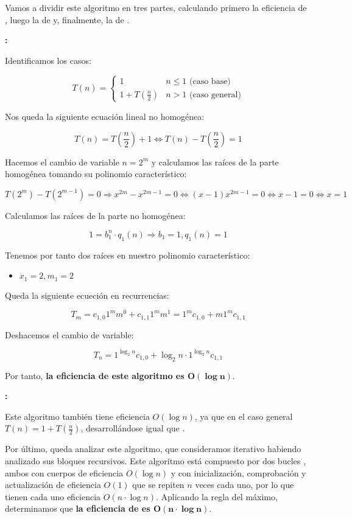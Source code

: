 Vamos a dividir este algoritmo en tres partes, calculando primero la eficiencia de , luego la de  y, finalmente, la de .

\textbf{:}

Identificamos los casos:

\[T(n)=
\begin{cases}
	1                & n\leq1\text{ (caso base)} \\
	1+T(\frac{n}{2}) & n>1\text{ (caso general)}
\end{cases}
\]

Nos queda la siguiente ecuación lineal no homogénea:

\[T(n)=T(\frac{n}{2})+1\Leftrightarrow T(n)-T(\frac{n}{2})=1\]

Hacemos el cambio de variable $n=2^m$ y calculamos las raíces de la parte homogénea tomando su polinomio característico:

\[T(2^m)-T(2^{m-1})=0\Rightarrow x^{2m}-x^{2m-1}=0\Leftrightarrow(x-1)x^{2m-1}=0\Leftrightarrow x-1=0\Leftrightarrow x=1\]

Calculamos las raíces de la parte no homogénea:

\[1=b_1^n\cdot q_1(n)\Rightarrow b_1=1,q_1(n)=1\]

Tenemos por tanto dos raíces en nuestro polinomio característico:

\begin{itemize}
	\item $x_1=2, m_1=2$
\end{itemize}

Queda la siguiente ecueción en recurrencias:

\[T_m=c_{1,0}1^m m^0+c_{1,1}1^m m^1=1^m c_{1,0}+m1^m c_{1,1}\]

Deshacemos el cambio de variable:

\[T_n=1^{\log_2n}c_{1,0}+\log_2n\cdot1^{\log_2n}c_{1,1}\]

Por tanto, \textbf{la eficiencia de este algoritmo es $\boldsymbol{O(\log n)}$}.

\textbf{:}

Este algoritmo también tiene eficiencia $O(\log n)$, ya que en el caso general $T(n)=1+T(\frac{n}{2})$, desarrollándose igual que .

\textbf{}

Por último, queda analizar este algoritmo, que consideramos iterativo habiendo analizado sus bloques recursivos.
Este algoritmo está compuesto por dos bucles , ambos con cuerpos de eficiencia $O(\log n)$ y con inicialización, comprobación y actualización de eficiencia $O(1)$ que se repiten $n$ veces cada uno, por lo que tienen cada uno eficiencia $O(n\cdot\log n)$.
Aplicando la regla del máximo, determinamos que \textbf{la eficiencia de  es $\boldsymbol{O(n\cdot\log n)}$}.

